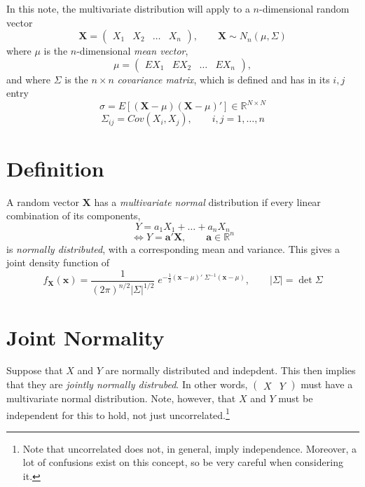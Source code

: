 \documentclass[a4paper,12pt]{scrartcl}
\begin{document}
In this note, the multivariate distribution will apply to a
$n$-dimensional random vector 
\[ \mathbf{X} = \begin{pmatrix} X_1 & X_2 & \ldots & X_n \end{pmatrix},
   \qquad \mathbf{X}  \sim N_n(\mu, \Sigma) \]
where $\mu$ is the $n$-dimensional \emph{mean vector},
\[ \mu = \begin{pmatrix} EX_1 & EX_2 & \ldots & EX_n \end{pmatrix},
      \]
and where $\Sigma$ is the $n\times n$ \emph{covariance matrix}, which
is defined and has in its $i,j$ entry
\[ \sigma = E\left[ (\mathbf{X} - \mu) (\mathbf{X}-\mu)'\right] \in
   \mathbb{R}^{N\times N} \] 
\[ \Sigma_{ij} = Cov(X_i, X_j), \qquad i,j = 1, \ldots, n\]

\section{Definition}

A random vector $\mathbf{X}$ has a \emph{multivariate normal} 
distribution if every linear combination of its components,
\[ Y = a_1 X_1 + \ldots + a_n X_n \] 
\[ \Leftrightarrow Y = \mathbf{a}' \mathbf{X}, \qquad
   \mathbf{a} \in \mathbb{R}^n \]
is \emph{normally
distributed}, with a corresponding mean and variance. This gives a 
joint density function of 
   \[ f_\mathbf{X}(\mathbf{x}) = \frac{1}{(2\pi)^{n/2} \lvert \Sigma
      \rvert^{1/2}} \; e^{ -\frac{1}{2} (\mathbf{x} - \mu)' \;
      \Sigma^{-1} (\mathbf{x} - \mu) }, \qquad \lvert\Sigma\rvert =
      \det\Sigma\]
   
\section{Joint Normality}

Suppose that $X$ and $Y$ are normally distributed and indepdent. This
then implies that they are \emph{jointly normally distrubed}. In other
words, $\begin{pmatrix} X & Y \end{pmatrix}$ must have a multivariate
normal distribution. Note, however, that $X$ and $Y$ must be independent 
for this to hold, not just uncorrelated.\footnote{Note that 
uncorrelated does not, in general, imply independence. Moreover, a lot
of confusions exist on this concept, so be very careful when considering
it.}
\end{document}
